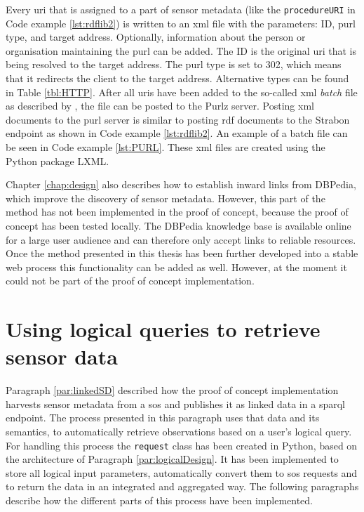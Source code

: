 Every \ac{uri} that is assigned to a part of sensor metadata (like the \texttt{procedureURI} in Code example \ref{lst:rdflib2}) is written to an \ac{xml} file with the parameters: ID, \ac{purl} type, and target address. Optionally, information about the person or organisation maintaining the \ac{purl} can be added. The ID is the original \ac{uri} that is being resolved to the target address. The \ac{purl} type is set to 302, which means that it redirects the client to the target address. Alternative types can be found in Table \ref{tbl:HTTP}. After all \acp{uri} have been added to the so-called \ac{xml} \textit{batch} file as described by \cite{LD:PURL2}, the file can be posted to the Purlz server. Posting \ac{xml} documents to the \ac{purl} server is similar to posting \ac{rdf} documents to the Strabon endpoint as shown in Code example \ref{lst:rdflib2}. An example of a batch file can be seen in Code example \ref{lst:PURL}. These \ac{xml} files are created using the Python package LXML. 

Chapter \ref{chap:design} also describes how to establish inward links from DBPedia, which improve the discovery of sensor metadata. However, this part of the method has not been implemented in the proof of concept, because the proof of concept has been tested locally. The DBPedia knowledge base is available online for a large user audience and can therefore only accept links to reliable resources. Once the method presented in this thesis has been further developed into a stable web process this functionality can be added as well. However, at the moment it could not be part of the proof of concept implementation.  

\section{Using logical queries to retrieve sensor data}
\label{par:logicalQuery}
Paragraph \ref{par:linkedSD} described how the proof of concept implementation harvests sensor metadata from a \ac{sos} and publishes it as linked data in a \ac{sparql} endpoint. The process presented in this paragraph uses that data and its semantics, to automatically retrieve observations based on a user's logical query. For handling this process the \texttt{request} class has been created in Python, based on the architecture of Paragraph \ref{par:logicalDesign}. It has been implemented to store all logical input parameters, automatically convert them to \ac{sos} requests and to return the data in an integrated and aggregated way. The following paragraphs describe how the different parts of this process have been implemented.

